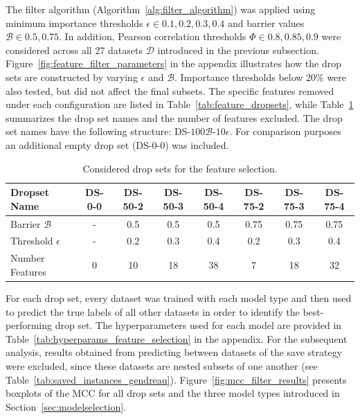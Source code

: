 The filter algorithm (Algorithm~\ref{alg:filter_algorithm}) was applied using minimum importance thresholds $\epsilon \in {0.1, 0.2, 0.3, 0.4}$
and barrier values $\mathcal{B} \in {0.5, 0.75}$. In addition, Pearson correlation thresholds $\Phi \in {0.8, 0.85, 0.9}$ were considered
across all 27 datasets $\mathcal{D}$ introduced in the previous subsection. Figure~\ref{fig:feature_filter_parameters} in the appendix
illustrates how the drop sets are constructed by varying $\epsilon$ and $\mathcal{B}$. Importance thresholds below 20\% were also tested, but
did not affect the final subsets. The specific features removed under each configuration are listed in Table~\ref{tab:feature_dropsets},
while Table~\ref{tab:drop_set_presentation_shortened} summarizes the drop set names and the number of features excluded. The drop set
names have the following structure: DS-$100\mathcal{B}$-$10\epsilon$. For comparison purposes an additional empty drop set (DS-0-0) was included.

\begin{table}[ht]
    \centering
    \small
    \begin{tabular}{l c c c c c c c}
        \toprule
        Dropset Name          & DS-0-0 & DS-50-2 & DS-50-3 & DS-50-4 & DS-75-2 & DS-75-3 & DS-75-4 \\
        \midrule
        Barrier $\mathcal{B}$ & -      & 0.5     & 0.5     & 0.5     & 0.75    & 0.75    & 0.75    \\
        Threshold $\epsilon$  & -      & 0.2     & 0.3     & 0.4     & 0.2     & 0.3     & 0.4     \\
        Number Features       & 0      & 10      & 18      & 38      & 7       & 18      & 32      \\
        \bottomrule
    \end{tabular}
    \caption{Considered drop sets for the feature selection.}
    \label{tab:drop_set_presentation_shortened}
\end{table}
For each drop set, every dataset was trained with each model type and then used to predict the
true labels of all other datasets in order to identify the best-performing drop set. The hyperparameters used for
each model are provided in Table~\ref{tab:hyperparams_feature_selection} in the appendix. For the subsequent analysis,
results obtained from predicting between datasets of the save strategy were excluded, since these datasets are nested
subsets of one another (see Table~\ref{tab:saved_instances_gendreau}). Figure~\ref{fig:mcc_filter_results} presents boxplots of
the \gls{MCC} for all drop sets and the three model types introduced in Section~\ref{sec:modelselection}.

